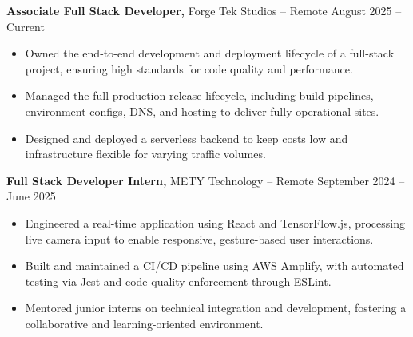\documentclass[11pt]{article}       %
\begin{document}
\textbf{Associate Full Stack Developer,} {Forge Tek Studios} -- Remote \hfill August 2025 -- Current 
\vspace{-9pt}
\begin{itemize}
  \item Owned the end-to-end development and deployment lifecycle of a full-stack project, ensuring high standards for code quality and performance.
  \item Managed the full production release lifecycle, including build pipelines, environment configs, DNS, and hosting to deliver fully operational sites.
  \item Designed and deployed a serverless backend to keep costs low and infrastructure flexible for varying traffic volumes.
\end{itemize}

\textbf{Full Stack Developer Intern,} {METY Technology} -- Remote \hfill September 2024 -- June 2025 
\vspace{-9pt}
\begin{itemize}
  \item Engineered a real-time application using React and TensorFlow.js, processing live camera input to enable responsive, gesture-based user interactions.
  \item Built and maintained a CI/CD pipeline using AWS Amplify, with automated testing via Jest and code quality enforcement through ESLint.
  \item Mentored junior interns on technical integration and development, fostering a collaborative and learning-oriented environment.
\end{itemize}

\end{document}

